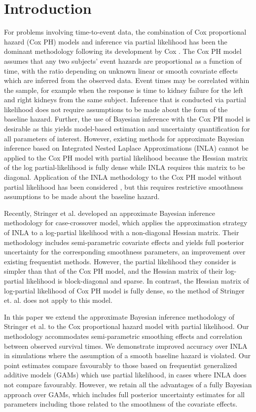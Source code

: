 \documentclass[num-refs,serif,10pt]{wiley-article}
\begin{document}
\section{Introduction}\label{sec1}
For problems involving time-to-event data, the combination of Cox proportional hazard (Cox PH) models and inference via partial likelihood has been the dominant methodology following its development by Cox \cite{coxph}. The Cox PH model assumes that any two subjects' event hazards are proportional as a function of time, with the ratio depending on unknown linear or smooth covariate effects which are inferred from the observed data. Event times may be correlated within the sample, for example when the response is time to kidney failure for the left and right kidneys from the same subject. Inference that is conducted via partial likelihood does not require assumptions to be made about the form of the baseline hazard. Further, the use of Bayesian inference with the Cox PH model is desirable as this yields model-based estimation and uncertainty quantification for all parameters of interest. However, existing methods for approximate Bayesian inference based on Integrated Nested Laplace Approximations (INLA) \cite{inla} cannot be applied to the Cox PH model with partial likelihood because the Hessian matrix of the log partial-likelihood is fully dense while INLA requires this matrix to be diagonal. Application of the INLA methodology to the Cox PH model without partial likelihood has been considered \cite{inlacoxph}, but this requires restrictive smoothness assumptions to be made about the baseline hazard.

Recently, Stringer et al. \cite{casecross} developed an approximate Bayesian inference methodology for case-crossover model, which applies the approximation strategy of INLA to a log-partial likelihood with a non-diagonal Hessian matrix. Their methodology includes semi-parametric covariate effects and yields full posterior uncertainty for the corresponding smoothness parameters, an improvement over existing frequentist methods. However, the partial likelihood they consider is simpler than that of the Cox PH model, and the Hessian matrix of their log-partial likelihood is block-diagonal and sparse. In contrast, the Hessian matrix of log-partial likelihood of Cox PH model is fully dense, so the method of Stringer et. al. \cite{casecross} does not apply to this model.

In this paper we extend the approximate Bayesian inference methodology of Stringer et al. \cite{casecross} to the Cox proportional hazard model with partial likelihood. Our methodology accommodates semi-parametric smoothing effects and correlation between observed survival times. We demonstrate improved accuracy over INLA in simulations where the assumption of a smooth baseline hazard is violated. Our point estimates compare favourably to those based on frequentist generalized additive models (GAMs) which use partial likelihood, in cases where INLA does not compare favourably. However, we retain all the advantages of a fully Bayesian approach over GAMs, which includes full posterior uncertainty estimates for all parameters including those related to the smoothness of the covariate effects.
\end{document}
